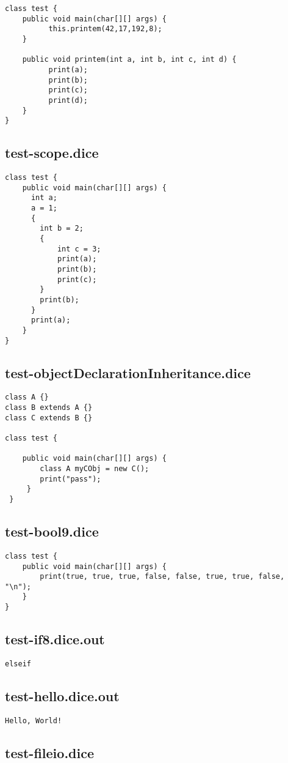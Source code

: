 \begin{verbatim}
class test {
	public void main(char[][] args) {
		  this.printem(42,17,192,8);
	}

	public void printem(int a, int b, int c, int d) {
		  print(a);
		  print(b);
		  print(c);
		  print(d);
	}
}

\end{verbatim}\pagebreak\subsection{test-scope.dice}
\begin{verbatim}
class test {
	public void main(char[][] args) {
	  int a;
	  a = 1;
	  {
	  	int b = 2;
	  	{
	  		int c = 3;
	  		print(a);
	  		print(b);
	  		print(c);
	  	}
	  	print(b);
	  }
	  print(a);
	}
}

\end{verbatim}\pagebreak\subsection{test-objectDeclarationInheritance.dice}
\begin{verbatim}
class A {}
class B extends A {}
class C extends B {}

class test {

	public void main(char[][] args) {
		class A myCObj = new C();
		print("pass");
	 }
 }
\end{verbatim}\pagebreak\subsection{test-bool9.dice}
\begin{verbatim}
class test {
    public void main(char[][] args) {
        print(true, true, true, false, false, true, true, false, "\n");
    }
}
\end{verbatim}\pagebreak\subsection{test-if8.dice.out}
\begin{verbatim}
elseif
\end{verbatim}\pagebreak\subsection{test-hello.dice.out}
\begin{verbatim}
Hello, World!
\end{verbatim}\pagebreak\subsection{test-fileio.dice}
